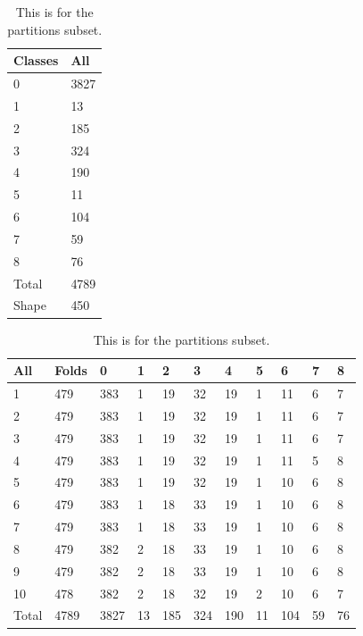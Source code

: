 \documentclass[ms]{nuthesis}
\begin{document}
\FloatBarrier
\begin{table}[!htb]
\centering
\begin{subtable}{.15\linewidth}
  \centering
  \begin{tabular}{|l||l|}\toprule
    Classes & All \\ \midrule
    0 & 3827 \\
    1 & 13 \\
    2 & 185 \\
    3 & 324 \\
    4 & 190 \\
    5 & 11 \\
    6 & 104 \\
    7 & 59 \\
    8 & 76 \\
    Total & 4789 \\
    Shape & 450 \\
 \bottomrule
  \end{tabular}
  \label{tab:ClassesSub}
  \caption{Classes Subset}
\end{subtable}%
\begin{subtable}{.85\linewidth}
\centering
  \begin{tabular}{|l||l||l||l||l||l||l||l||l||l||l|}\toprule
    All & Folds & 0 & 1 & 2 & 3 & 4 & 5 & 6 & 7 & 8 \\ \midrule
    1 & 479 & 383 & 1 & 19 & 32 & 19 & 1 & 11 & 6 & 7 \\
    2 & 479 & 383 & 1 & 19 & 32 & 19 & 1 & 11 & 6 & 7 \\
    3 & 479 & 383 & 1 & 19 & 32 & 19 & 1 & 11 & 6 & 7 \\
    4 & 479 & 383 & 1 & 19 & 32 & 19 & 1 & 11 & 5 & 8 \\
    5 & 479 & 383 & 1 & 19 & 32 & 19 & 1 & 10 & 6 & 8 \\
    6 & 479 & 383 & 1 & 18 & 33 & 19 & 1 & 10 & 6 & 8 \\
    7 & 479 & 383 & 1 & 18 & 33 & 19 & 1 & 10 & 6 & 8 \\
    8 & 479 & 382 & 2 & 18 & 33 & 19 & 1 & 10 & 6 & 8 \\
    9 & 479 & 382 & 2 & 18 & 33 & 19 & 1 & 10 & 6 & 8 \\
    10 & 478 & 382 & 2 & 18 & 32 & 19 & 2 & 10 & 6 & 7 \\ \midrule
    Total & 4789 & 3827 & 13 & 185 & 324 & 190 & 11 & 104 & 59 & 76 \\
 \bottomrule
  \end{tabular}
  \label{tab:Partitions Subset}
  \caption{Folds Subset}
  \end{subtable}
  \caption{This is for the partitions subset.}
\end{table}
\FloatBarrier
\end{document}
